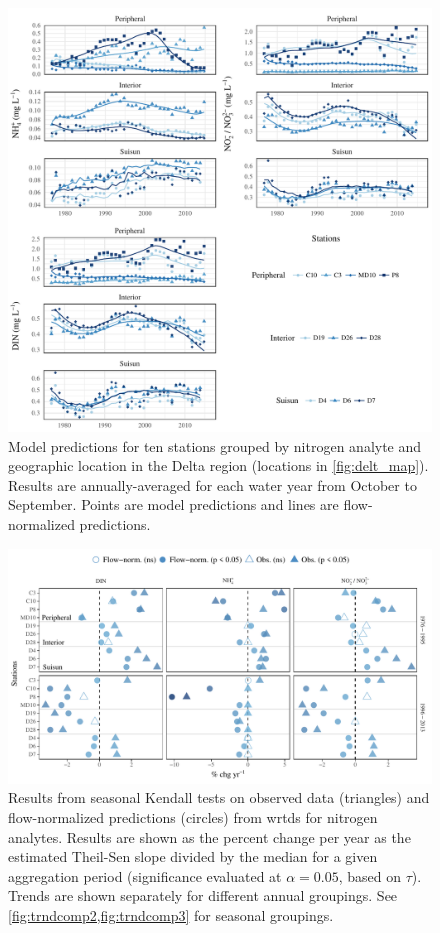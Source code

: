 \documentclass[letterpaper,12pt,oneside]{article}\usepackage[]{graphicx}\usepackage[]{color}
\makeatletter
\def\maxwidth{ %
  \ifdim\Gin@nat@width>\linewidth
    \linewidth
  \else
    \Gin@nat@width
  \fi
}
\makeatother
\begin{document}
\begin{figure}[!ht]

{\centering \includegraphics[width=\maxwidth]{figs/prddat-1} 

}

\caption{Model predictions for ten stations grouped by nitrogen analyte and geographic location in the Delta region (locations in \cref{fig:delt_map}).  Results are annually-averaged for each water year from October to September.  Points are model predictions and lines are flow-normalized predictions.}\label{fig:prddat}
\end{figure}





\begin{figure}
\centering
\includegraphics[width=1\textwidth,page=1]{figs/trndcomp1.pdf}
\caption{Results from seasonal Kendall tests on observed data (triangles) and flow-normalized predictions (circles) from \ac{wrtds} for nitrogen analytes. Results are shown as the percent change per year as the estimated Theil-Sen slope divided by the median for a given aggregation period (significance evaluated at $\alpha = 0.05$, based on $\tau$). Trends are shown separately for different annual groupings. See \cref{fig:trndcomp2,fig:trndcomp3} for seasonal groupings.}
\label{fig:trndcomp1}   
\end{figure}
\end{document}

